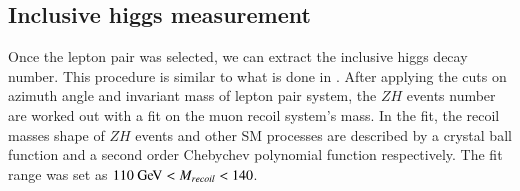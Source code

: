 \subsection{Inclusive higgs measurement}
\label{sec:inclusive_higgs_measurement}
Once the lepton pair was selected, we can extract the inclusive higgs decay number. 
This procedure is similar to what is done in \cite{CEPC:recoilmass}. 
After applying the cuts on azimuth angle and invariant mass of lepton pair system, the $ZH$ events number are worked out with a fit on the muon recoil system's mass. 
In the fit, the recoil masses shape of $ZH$ events and other SM processes are described by a crystal ball function and a second order Chebychev polynomial function respectively. 
The fit range was set as $110\GeV<M_{recoil}<140$\GeV.  \par